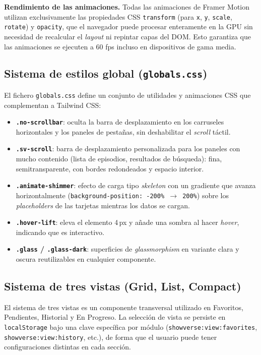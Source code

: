 \textbf{Rendimiento de las animaciones.} Todas las animaciones de Framer Motion utilizan exclusivamente las propiedades CSS \texttt{transform} (para \texttt{x}, \texttt{y}, \texttt{scale}, \texttt{rotate}) y \texttt{opacity}, que el navegador puede procesar enteramente en la GPU sin necesidad de recalcular el \textit{layout} ni repintar capas del DOM. Esto garantiza que las animaciones se ejecuten a 60 fps incluso en dispositivos de gama media.

\subsection{Sistema de estilos global (\texttt{globals.css})}

El fichero \texttt{globals.css} define un conjunto de utilidades y animaciones CSS que complementan a Tailwind CSS:

\begin{itemize}
\item \textbf{\texttt{.no-scrollbar}}: oculta la barra de desplazamiento en los carruseles horizontales y los paneles de pestañas, sin deshabilitar el \textit{scroll} táctil.
\item \textbf{\texttt{.sv-scroll}}: barra de desplazamiento personalizada para los paneles con mucho contenido (lista de episodios, resultados de búsqueda): fina, semitransparente, con bordes redondeados y espacio interior.
\item \textbf{\texttt{.animate-shimmer}}: efecto de carga tipo \textit{skeleton} con un gradiente que avanza horizontalmente (\texttt{background-position: -200\% $\rightarrow$ 200\%}) sobre los \textit{placeholders} de las tarjetas mientras los datos se cargan.
\item \textbf{\texttt{.hover-lift}}: eleva el elemento 4\,px y añade una sombra al hacer \textit{hover}, indicando que es interactivo.
\item \textbf{\texttt{.glass} / \texttt{.glass-dark}}: superficies de \textit{glassmorphism} en variante clara y oscura reutilizables en cualquier componente.
\end{itemize}

\subsection{Sistema de tres vistas (Grid, List, Compact)}

El sistema de tres vistas es un componente transversal utilizado en Favoritos, Pendientes, Historial y En Progreso. La selección de vista se persiste en \texttt{localStorage} bajo una clave específica por módulo (\texttt{showverse:view:favorites}, \texttt{showverse:view:history}, etc.), de forma que el usuario puede tener configuraciones distintas en cada sección.

